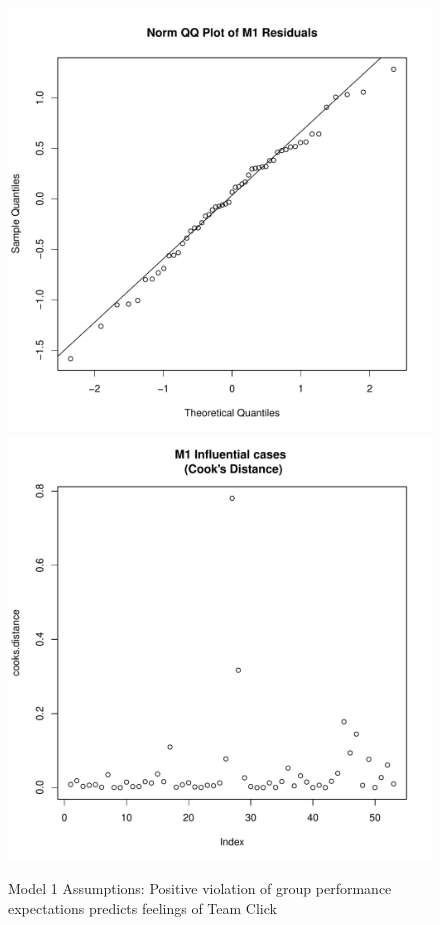 \begin{figure}[htbp]
    \includegraphics[scale =.4]{images/TEM1QQNorm.pdf}
    \includegraphics[scale =.4]{images/TEM1CooksD.pdf}
    \caption{Model 1 Assumptions: Positive violation of group performance expectations predicts feelings of Team Click}
    \label{fig:M1Assumptions}
\end{figure}


